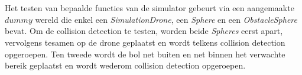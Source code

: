 \\
\\
Het testen van bepaalde functies van de simulator gebeurt via een aangemaakte \(dummy\) wereld die enkel een \textit{SimulationDrone}, een \textit{Sphere} en een \textit{ObstacleSphere} bevat. Om de collision detection te testen, worden beide \textit{Spheres} eerst apart, vervolgens tesamen op de drone geplaatst en wordt telkens collision detection opgeroepen. Ten tweede wordt de bol net buiten en net binnen het verwachte bereik geplaatst en wordt wederom collision detection opgeroepen. 
